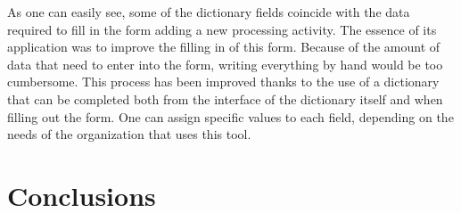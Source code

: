 \documentclass[en, noamssymb]{mgr}
\begin{document}
As one can easily see, some of the dictionary fields coincide with the data required to fill in the form adding a new processing activity. The essence of its application was to improve the filling in of this form. Because of the amount of data that need to enter into the form, writing everything by hand would be too cumbersome. This process has been improved thanks to the use of a dictionary that can be completed both from the interface of the dictionary itself and when filling out the form. One can assign specific values to each field, depending on the needs of the organization that uses this tool.

\chapter{Conclusions} \label{sec:sekcjaWnioski}
\end{document}
